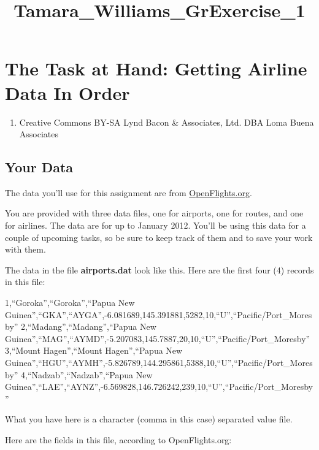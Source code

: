 \documentclass[11pt]{article}
\title{Tamara\_Williams\_GrExercise\_1}
\providecommand{\tightlist}{%
      \setlength{\itemsep}{0pt}\setlength{\parskip}{0pt}}
\begin{document}
    
    
    \maketitle
    
    

    
    \section{The Task at Hand: Getting Airline Data In
Order}\label{the-task-at-hand-getting-airline-data-in-order}

    \begin{enumerate}
\def\labelenumi{(\Roman{enumi})}
\setcounter{enumi}{199}
\tightlist
\item
  Creative Commons BY-SA Lynd Bacon \& Associates, Ltd. DBA Loma Buena
  Associates
\end{enumerate}

    \subsection{Your Data}\label{your-data}

    The data you'll use for this assignment are from
\href{http://www.openflights.org}{OpenFlights.org}.

    You are provided with three data files, one for airports, one for
routes, and one for airlines. The data are for up to January 2012.
You'll be using this data for a couple of upcoming tasks, so be sure to
keep track of them and to save your work with them.

    The data in the file \textbf{airports.dat} look like this. Here are the
first four (4) records in this file:

1,``Goroka'',``Goroka'',``Papua New
Guinea'',``GKA'',``AYGA'',-6.081689,145.391881,5282,10,``U'',``Pacific/Port\_Moresby''
2,``Madang'',``Madang'',``Papua New
Guinea'',``MAG'',``AYMD'',-5.207083,145.7887,20,10,``U'',``Pacific/Port\_Moresby''
3,``Mount Hagen'',``Mount Hagen'',``Papua New
Guinea'',``HGU'',``AYMH'',-5.826789,144.295861,5388,10,``U'',``Pacific/Port\_Moresby''
4,``Nadzab'',``Nadzab'',``Papua New
Guinea'',``LAE'',``AYNZ'',-6.569828,146.726242,239,10,``U'',``Pacific/Port\_Moresby''

    What you have here is a character (comma in this case) separated value
file.

Here are the fields in this file, according to OpenFlights.org:
\end{document}

